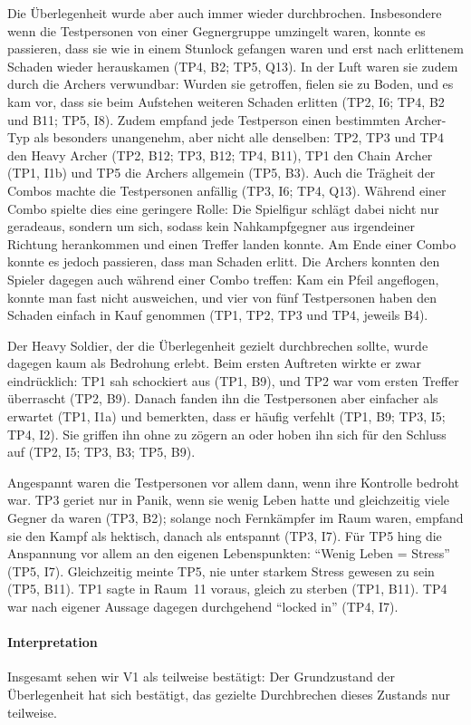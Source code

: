 \documentclass[../Main.tex]{subfiles}
\begin{document}
Die Überlegenheit wurde aber auch immer wieder durchbrochen. Insbesondere wenn die Testpersonen von einer Gegnergruppe umzingelt waren, konnte es passieren, dass sie wie in einem Stunlock gefangen waren und erst nach erlittenem Schaden wieder herauskamen (TP4, B2; TP5, Q13). In der Luft waren sie zudem durch die Archers verwundbar: Wurden sie getroffen, fielen sie zu Boden, und es kam vor, dass sie beim Aufstehen weiteren Schaden erlitten (TP2, I6; TP4, B2 und B11; TP5, I8). Zudem empfand jede Testperson einen bestimmten Archer-Typ als besonders unangenehm, aber nicht alle denselben: TP2, TP3 und TP4 den Heavy Archer (TP2, B12; TP3, B12; TP4, B11), TP1 den Chain Archer (TP1, I1b) und TP5 die Archers allgemein (TP5, B3). Auch die Trägheit der Combos machte die Testpersonen anfällig (TP3, I6; TP4, Q13). Während einer Combo spielte dies eine geringere Rolle: Die Spielfigur schlägt dabei nicht nur geradeaus, sondern um sich, sodass kein Nahkampfgegner aus irgendeiner Richtung herankommen und einen Treffer landen konnte. Am Ende einer Combo konnte es jedoch passieren, dass man Schaden erlitt. Die Archers konnten den Spieler dagegen auch während einer Combo treffen: Kam ein Pfeil angeflogen, konnte man fast nicht ausweichen, und vier von fünf Testpersonen haben den Schaden einfach in Kauf genommen (TP1, TP2, TP3 und TP4, jeweils B4).

Der Heavy Soldier, der die Überlegenheit gezielt durchbrechen sollte, wurde dagegen kaum als Bedrohung erlebt. Beim ersten Auftreten wirkte er zwar eindrücklich: TP1 sah schockiert aus (TP1, B9), und TP2 war vom ersten Treffer überrascht (TP2, B9). Danach fanden ihn die Testpersonen aber einfacher als erwartet (TP1, I1a) und bemerkten, dass er häufig verfehlt (TP1, B9; TP3, I5; TP4, I2). Sie griffen ihn ohne zu zögern an oder hoben ihn sich für den Schluss auf (TP2, I5; TP3, B3; TP5, B9).

Angespannt waren die Testpersonen vor allem dann, wenn ihre Kontrolle bedroht war. TP3 geriet nur in Panik, wenn sie wenig Leben hatte und gleichzeitig viele Gegner da waren (TP3, B2); solange noch Fernkämpfer im Raum waren, empfand sie den Kampf als hektisch, danach als entspannt (TP3, I7). Für TP5 hing die Anspannung vor allem an den eigenen Lebenspunkten: \enquote{Wenig Leben = Stress} (TP5, I7). Gleichzeitig meinte TP5, nie unter starkem Stress gewesen zu sein (TP5, B11). TP1 sagte in Raum~11 voraus, gleich zu sterben (TP1, B11). TP4 war nach eigener Aussage dagegen durchgehend \enquote{locked in} (TP4, I7).

\paragraph{Interpretation}
Insgesamt sehen wir V1 als teilweise bestätigt: Der Grundzustand der Überlegenheit hat sich bestätigt, das gezielte Durchbrechen dieses Zustands nur teilweise.
\end{document}
